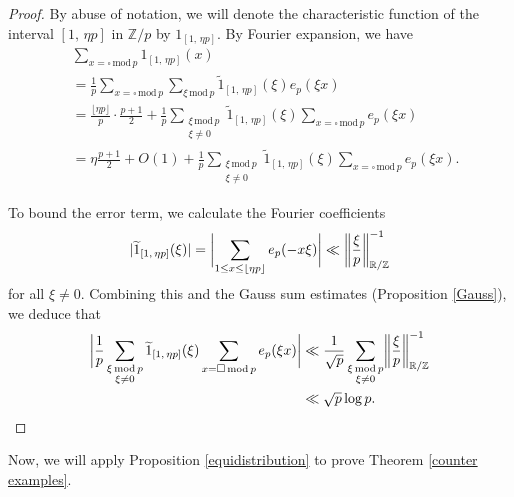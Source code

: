 \documentclass[11pt]{amsart}
\theoremstyle{plain} %
\theoremstyle{remark}
\numberwithin{equation}{section}
\newcommand{\R}{\mathbb{R}}
\newcommand{\Z}{\mathbb{Z}}
\DeclarePairedDelimiter\abs{\lvert}{\rvert}
\DeclarePairedDelimiter\norm{\lVert}{\rVert}
\begin{document}
\begin{proof}
    By abuse of notation, we will denote the characteristic function of the interval $[1,\,\eta p]$ in $\Z/p$ by $1_{[1,\,\eta p]}$. By Fourier expansion, we have
    \begin{equation*}
        \begin{split}
            &\sum_{x=\square\,\mathrm{mod}\,p}1_{[1,\,\eta p]}(x)\\
            &=\frac{1}{p}\sum_{x=\square\,\mathrm{mod}\,p}\sum_{\xi\,\mathrm{mod}\,p}\widetilde{1}_{[1,\,\eta p]}(\xi)e_p(\xi x)\\
            &=\frac{\lfloor \eta p \rfloor}{p}\cdot\frac{p+1}{2}+\frac{1}{p}\sum_{\substack{\xi\,\mathrm{mod}\,p\\\xi\neq 0}}\widetilde{1}_{[1,\,\eta p]}(\xi)\sum_{x=\square\,\mathrm{mod}\,p}e_p(\xi x)\\
            &=\eta\frac{p+1}{2}+O(1)+\frac{1}{p}\sum_{\substack{\xi\,\mathrm{mod}\,p\\\xi\neq 0}}\widetilde{1}_{[1,\,\eta p]}(\xi)\sum_{x=\square\,\mathrm{mod}\,p}e_p(\xi x).
        \end{split}
    \end{equation*}

    To bound the error term, we calculate the Fourier coefficients
    \begin{equation*}
        \abs{\widetilde{1}_{[1,\,\eta p]}(\xi)}=\abs[\bigg]{\sum_{1\leq x\leq \lfloor \eta p \rfloor}e_p(-x\xi)}\ll \norm[\bigg]{\frac{\xi}{p}}_{\R/\Z}^{-1}
    \end{equation*}
    for all $\xi\neq 0$. Combining this and the Gauss sum estimates (Proposition \ref{Gauss}), we deduce that
    \begin{equation*}
        \begin{split}
            \abs[\bigg]{\frac{1}{p}\sum_{\substack{\xi\,\mathrm{mod}\,p\\\xi\neq 0}}\widetilde{1}_{[1,\,\eta p]}(\xi)\sum_{x=\square\,\mathrm{mod}\,p}e_p(\xi x)}&\ll \frac{1}{\sqrt{p}}\sum_{\substack{\xi\,\mathrm{mod}\,p\\\xi\neq 0}}\norm[\bigg]{\frac{\xi}{p}}_{\R/\Z}^{-1}\\
            &\ll \sqrt{p}\log p.
        \end{split}
    \end{equation*}
\end{proof}

Now, we will apply Proposition \ref{equidistribution} to prove Theorem \ref{counter examples}.
\end{document}
